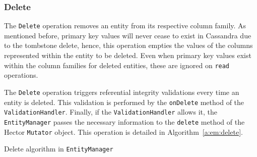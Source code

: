 		
% 		
% 		 
		
		
		\subsubsection{Delete}\label{ss:delete}
		The  \texttt{Delete} operation removes  an entity from its respective column
		family.  As mentioned before,  primary key values  will never cease to exist
		in Cassandra due to the tombstone delete, hence, this operation
		empties the values of the columns represented within the entity to be deleted.
		Even when primary key values exist within the column families for deleted
		entities, these are ignored on \texttt{read} operations.
		
		The \texttt{Delete} operation triggers referential
		integrity validations every time an entity is deleted.  
		 This validation is performed by the \texttt{onDelete} method of the
		 \texttt{ValidationHandler}.  Finally,  if the
		\texttt{ValidationHandler} allows it, the \texttt{EntityManager} passes the
		 necessary information to the \texttt{delete} method of the Hector
		 \texttt{Mutator} object. This operation is detailed in
		 Algorithm~\ref{a:em:delete}.
 		
 		\begin{algorithm}[H]
			\caption{Delete algorithm in \texttt{EntityManager}}\label{a:em:delete}
			 
			
		\end{algorithm}
		
